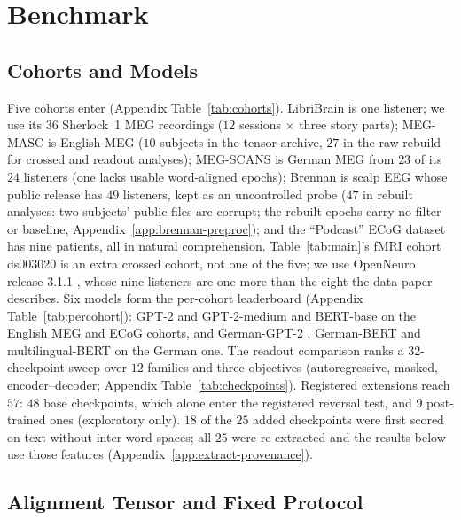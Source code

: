 \documentclass{article}
\begin{document}
\section{Benchmark}\label{benchmark}

\subsection{Cohorts and Models}\label{sec:cohorts}\label{sec:models}

Five cohorts enter (Appendix Table~\ref{tab:cohorts}). LibriBrain \citep{ozdogan2025libribrain} is
one listener; we use its $36$ Sherlock~1 MEG recordings ($12$ sessions $\times$ three story parts); MEG-MASC
\citep{gwilliams2023megmasc} is English MEG ($10$ subjects in the tensor archive, $27$
in the raw rebuild for crossed and readout analyses); MEG-SCANS \citep{habersetzer2025megscans} is German MEG from $23$ of its $24$ listeners
(one lacks usable word-aligned epochs); Brennan \citep{brennan2019hierarchical} is scalp EEG whose public release
\citep{brennan2018alice} has $49$ listeners, kept as an uncontrolled probe
($47$ in rebuilt analyses: two subjects' public files are corrupt; the rebuilt epochs carry no filter or baseline, Appendix~\ref{app:brennan-preproc});
and the ``Podcast'' ECoG dataset \citep{zada2025podcast} has nine patients, all in natural
comprehension. Table~\ref{tab:main}'s fMRI cohort ds003020 \citep{lebel2023natural} is an extra
crossed cohort, not one of the five; we use OpenNeuro release 3.1.1 \citep{lebel2026openneuro}, whose
nine listeners are one more than the eight the data paper describes. Six models form the per-cohort leaderboard
(Appendix Table~\ref{tab:percohort}): GPT-2 and GPT-2-medium
\citep{radford2019language} and BERT-base \citep{devlin2019bert} on the English MEG and ECoG cohorts, and German-GPT-2 \citep{dbmdz2020germangpt2}, German-BERT \citep{deepset2019germanbert}
and multilingual-BERT \citep{devlin2019bert} on the German one. The readout comparison ranks a
$32$-checkpoint sweep over $12$ families and three objectives (autoregressive, masked,
encoder--decoder; Appendix Table~\ref{tab:checkpoints}). Registered extensions reach $57$: $48$ base checkpoints,
which alone enter the registered reversal test, and $9$ post-trained ones
(exploratory only). $18$ of the $25$ added checkpoints were first scored on text without inter-word
spaces; all $25$ were re-extracted and the results below use those features
(Appendix~\ref{app:extract-provenance}).

\subsection{Alignment Tensor and Fixed Protocol}\label{sec:tensor}
\end{document}

